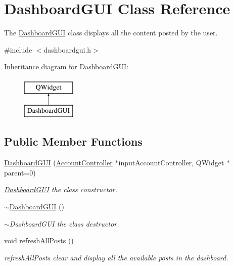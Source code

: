 \hypertarget{classDashboardGUI}{}\section{Dashboard\+G\+UI Class Reference}
\label{classDashboardGUI}


The \hyperlink{classDashboardGUI}{Dashboard\+G\+UI} class displays all the content posted by the user.  




{\ttfamily \#include $<$dashboardgui.\+h$>$}

Inheritance diagram for Dashboard\+G\+UI\+:\begin{figure}[H]
\begin{center}
\leavevmode
\includegraphics[height=2.000000cm]{classDashboardGUI}
\end{center}
\end{figure}
\subsection*{Public Member Functions}
\begin{DoxyCompactItemize}
\item 
\hyperlink{classDashboardGUI_a835f1875b5797a133bad8a133c743ccd}{Dashboard\+G\+UI} (\hyperlink{classAccountController}{Account\+Controller} $\ast$input\+Account\+Controller, Q\+Widget $\ast$parent=0)
\begin{DoxyCompactList}\small\item\em \hyperlink{classDashboardGUI}{Dashboard\+G\+UI} the class constructor. \end{DoxyCompactList}\item 
\hyperlink{classDashboardGUI_aabe4caf64e4421ed0ac91a2b34bd71b6}{$\sim$\+Dashboard\+G\+UI} ()
\begin{DoxyCompactList}\small\item\em $\sim$\+Dashboard\+G\+UI the class destructor. \end{DoxyCompactList}\item 
void \hyperlink{classDashboardGUI_a54dd95b6964e08f30cf35227e5bdb10f}{refresh\+All\+Posts} ()\hypertarget{classDashboardGUI_a54dd95b6964e08f30cf35227e5bdb10f}{}\label{classDashboardGUI_a54dd95b6964e08f30cf35227e5bdb10f}

\begin{DoxyCompactList}\small\item\em refresh\+All\+Posts clear and display all the available posts in the dashboard. \end{DoxyCompactList}\end{DoxyCompactItemize}



